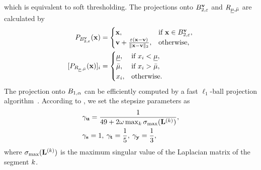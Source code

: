 which is equivalent to soft thresholding.
The projections onto $B_{2, \varepsilon}^{\mathbf{v}}$ and $R_{\underline{\mu},\bar{\mu}}$ are calculated by
\begin{align}
    \label{eq:ProjL2ball}
    P_{B_{2, \varepsilon}^{\mathbf{v}}}(\mathbf{x}) &= 
    \begin{cases}
        \mathbf{x}, & \text{if } \mathbf{x} \in B_{2, \varepsilon}^{\mathbf{v}}, \\ 
        \mathbf{v} + \frac{\varepsilon (\mathbf{x} - \mathbf{v})}{\| \mathbf{x} - \mathbf{v} \|_2}, & \text{otherwise,}
    \end{cases} \\
    \label{eq:ProjRange}
    \lbrack P_{R_{\underline{\mu},\bar{\mu}}} (\mathbf{x}) \rbrack_{i} 
    &= 
    \begin{cases} 
            \underline{\mu}, & \text{if } x_{i} < \underline{\mu}, \\ 
            \bar{\mu}, & \text{if } x_{i}> \bar{\mu}, \\ 
            x_{i}, & \text{otherwise.} 
    \end{cases}
\end{align}
The projection onto $B_{1, \alpha}$ can be efficiently computed by a fast $\ell_{1}$-ball projection algorithm~\cite{Condat2016L1ball}.
According to \cite{Naganuma2023PPDS}, we set the stepsize parameters as 
\begin{align}
    \label{eq:StepsizeParams}
    & \gamma_{\mathbf{u}} = \frac{1}{49 + 2 \omega \max_{k} \sigma_{\text{max}} (\mathbf{L}^{(k)})}, \notag \\
    & \gamma_{\mathbf{s}} = 1, \: 
    \gamma_{\mathbf{t}} = \frac{1}{5}, \:
    \gamma_{\mathbf{y}{}} = \frac{1}{3},
\end{align}
where $\sigma_{\text{max}} (\mathbf{L}^{(k)})$ is the maximum singular value of the Laplacian matrix of the segment $k$.

